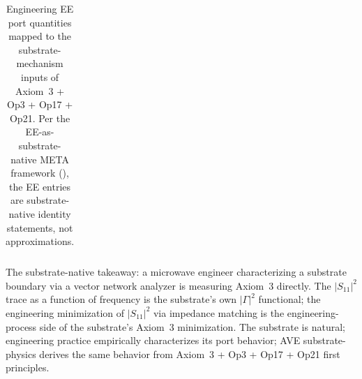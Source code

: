 \begin{table}[htbp]
\begin{tabular}{p{0.22\linewidth} p{0.40\linewidth} p{0.30\linewidth}}
\bottomrule
\end{tabular}
\caption{Engineering EE port quantities mapped to the substrate-mechanism inputs of Axiom~3 + Op3 + Op17 + Op21. Per the EE-as-substrate-native META framework (), the EE entries are substrate-native identity statements, not approximations.}
\label{tab:vol9_ee_translation}
\end{table}

The substrate-native takeaway: a microwave engineer characterizing a substrate boundary via a vector network analyzer is measuring Axiom~3 directly. The $|S_{11}|^2$ trace as a function of frequency is the substrate's own $|\Gamma|^2$ functional; the engineering minimization of $|S_{11}|^2$ via impedance matching is the engineering-process side of the substrate's Axiom~3 minimization. The substrate is natural; engineering practice empirically characterizes its port behavior; AVE substrate-physics derives the same behavior from Axiom~3 + Op3 + Op17 + Op21 first principles.


